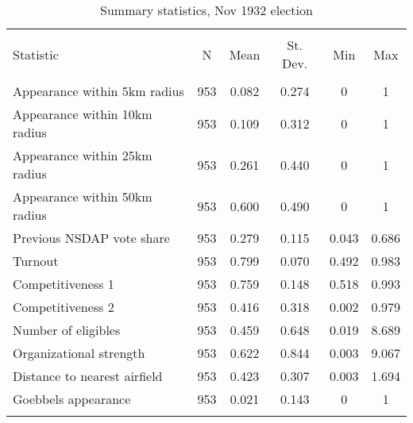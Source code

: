 
\begin{table}[!htbp] \centering 
  \caption{Summary statistics, Nov 1932 election} 
  \label{tab:sumstats1932r2} 
\begin{tabular}{@{\extracolsep{5pt}}lccccc} 
\\[-1.8ex]\hline \\[-1.8ex] 
Statistic & \multicolumn{1}{c}{N} & \multicolumn{1}{c}{Mean} & \multicolumn{1}{c}{St. Dev.} & \multicolumn{1}{c}{Min} & \multicolumn{1}{c}{Max} \\ 
\hline \\[-1.8ex] 
Appearance within 5km radius & 953 & 0.082 & 0.274 & 0 & 1 \\ 
Appearance within 10km radius & 953 & 0.109 & 0.312 & 0 & 1 \\ 
Appearance within 25km radius & 953 & 0.261 & 0.440 & 0 & 1 \\ 
Appearance within 50km radius & 953 & 0.600 & 0.490 & 0 & 1 \\ 
Previous NSDAP vote share & 953 & 0.279 & 0.115 & 0.043 & 0.686 \\ 
Turnout & 953 & 0.799 & 0.070 & 0.492 & 0.983 \\ 
Competitiveness 1 & 953 & 0.759 & 0.148 & 0.518 & 0.993 \\ 
Competitiveness 2 & 953 & 0.416 & 0.318 & 0.002 & 0.979 \\ 
Number of eligibles & 953 & 0.459 & 0.648 & 0.019 & 8.689 \\ 
Organizational strength & 953 & 0.622 & 0.844 & 0.003 & 9.067 \\ 
Distance to nearest airfield & 953 & 0.423 & 0.307 & 0.003 & 1.694 \\ 
Goebbels appearance & 953 & 0.021 & 0.143 & 0 & 1 \\ 
\hline \\[-1.8ex] 
\end{tabular} 
\end{table} 
